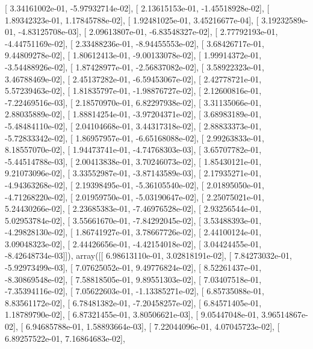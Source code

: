 \documentclass{article}
\begin{document}
       [  3.34161002e-01,  -5.97932714e-02],
       [  2.13615153e-01,  -1.45518928e-02],
       [  1.89342323e-01,   1.17845788e-02],
       [  1.92481025e-01,   3.45216677e-04],
       [  3.19232589e-01,  -4.83125708e-03],
       [  2.09613807e-01,  -6.83548327e-02],
       [  2.77792193e-01,  -4.44751169e-02],
       [  2.33488236e-01,  -8.94455553e-02],
       [  3.68426717e-01,   9.44809278e-02],
       [  1.80612413e-01,  -9.00133078e-02],
       [  1.99914372e-01,  -3.54488926e-02],
       [  1.87428977e-01,  -2.56837082e-02],
       [  3.58922323e-01,   3.46788469e-02],
       [  2.45137282e-01,  -6.59453067e-02],
       [  2.42778721e-01,   5.57239463e-02],
       [  1.81835797e-01,  -1.98876727e-02],
       [  2.12600816e-01,  -7.22469516e-03],
       [  2.18570970e-01,   6.82297938e-02],
       [  3.31135066e-01,   2.88035889e-02],
       [  1.88814254e-01,  -3.97204371e-02],
       [  3.68983189e-01,  -5.48484110e-02],
       [  2.04104668e-01,   3.44317318e-02],
       [  2.88833373e-01,  -5.72833342e-02],
       [  1.86957957e-01,  -6.65168088e-02],
       [  2.99263833e-01,   8.18557070e-02],
       [  1.94473741e-01,  -4.74768303e-03],
       [  3.65707782e-01,  -5.44514788e-03],
       [  2.00413838e-01,   3.70246073e-02],
       [  1.85430121e-01,   9.21073096e-02],
       [  3.33552987e-01,  -3.87143589e-03],
       [  2.17935271e-01,  -4.94363268e-02],
       [  2.19398495e-01,  -5.36105540e-02],
       [  2.01895050e-01,  -4.71268220e-02],
       [  2.01959750e-01,  -5.03190647e-02],
       [  2.25075021e-01,   5.24430266e-02],
       [  2.23685383e-01,  -7.46976528e-02],
       [  2.93256544e-01,   5.02953784e-02],
       [  3.55661670e-01,  -7.84292045e-02],
       [  3.53488393e-01,  -4.29828130e-02],
       [  1.86741927e-01,   3.78667726e-02],
       [  2.44100124e-01,   3.09048323e-02],
       [  2.44426656e-01,  -4.42154018e-02],
       [  3.04424455e-01,  -8.42648734e-03]]), array([[  6.98613110e-01,   3.02818191e-02],
       [  7.84273032e-01,  -5.92973499e-03],
       [  7.07625052e-01,   9.49776824e-02],
       [  8.52261437e-01,  -8.30869548e-02],
       [  7.58818505e-01,   9.89551303e-02],
       [  7.03407518e-01,  -7.35394116e-02],
       [  7.05622603e-01,  -1.13385271e-02],
       [  6.85735088e-01,   8.83561172e-02],
       [  6.78481382e-01,  -7.20458257e-02],
       [  6.84571405e-01,   1.18789790e-02],
       [  6.87321455e-01,   3.80506621e-03],
       [  9.05447048e-01,   3.96514867e-02],
       [  6.94685788e-01,   1.58893664e-03],
       [  7.22044096e-01,   4.07045723e-02],
       [  6.89257522e-01,   7.16864683e-02],
\end{document}
